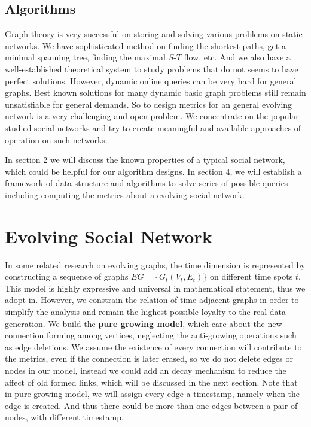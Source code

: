 \documentclass[12pt,abstract=true]{scrartcl}
\numberwithin{equation}{section}
\theoremstyle{definition}   \newtheorem{definition}{Definition}[section]
\theoremstyle{plain}        \newtheorem{theorem}{Theorem}[section]
\theoremstyle{plain}        \newtheorem{observation}{Observation}[section]
\theoremstyle{plain}        \newtheorem{fact}{Fact}[section]
\theoremstyle{plain}        \newtheorem{claim}{Claim}[section]
\theoremstyle{plain}        \newtheorem{lemma}[theorem]{Lemma}
\theoremstyle{plain}        \newtheorem{corollary}[theorem]{Corollary}
\theoremstyle{remark}       \newtheorem{example}{Example}[section]
\theoremstyle{remark}       \newtheorem{remark}{Remark}[section]
\begin{document}
\subsection{Algorithms}
Graph theory is very successful on storing and solving various problems on
static networks. We have sophisticated method on finding the shortest
paths, get a minimal spanning tree, finding the maximal $S$-$T$ flow, etc.
And we also have a well-established theoretical system to study problems that
do not seems to have perfect solutions. However, dynamic online queries can be
very hard for general graphs. Best known solutions for many dynamic basic graph
problems still remain unsatisfiable for general demands. So to design metrics
for an general evolving network is a very challenging and open problem. We
concentrate on the popular studied social networks and try to create meaningful
and available approaches of operation on such networks.

In section 2 we will discuss the known properties of a typical social network,
which could be helpful for our algorithm designs. In section 4, we will
establish a framework of data structure and algorithms to solve series of
possible queries including computing the metrics about a evolving social
network.

\section{Evolving Social Network}
In some related research on evolving graphs, the time dimension is represented
by constructing a sequence of graphs $EG=\{G_t(V_t,E_t)\}$ on different time
spots $t$. This model is highly expressive and universal in mathematical
statement, thus we adopt in. However, we constrain the relation of
time-adjacent graphs in order to simplify the analysis and remain the highest
possible loyalty to the real data generation. We build the \textbf{pure growing
model}, which care about the new connection forming among vertices, neglecting
the anti-growing operations such as edge deletions. We assume the existence of
every connection will contribute to the metrics, even if the connection is
later erased, so we do not delete edges or nodes in our model, instead we could
add an decay mechanism to reduce the affect of old formed links, which will be
discussed in the next section. Note that in pure growing model, we will assign
every edge a timestamp, namely when the edge is created. And thus there could
be more than one edges between a pair of nodes, with different timestamp.
\end{document}
